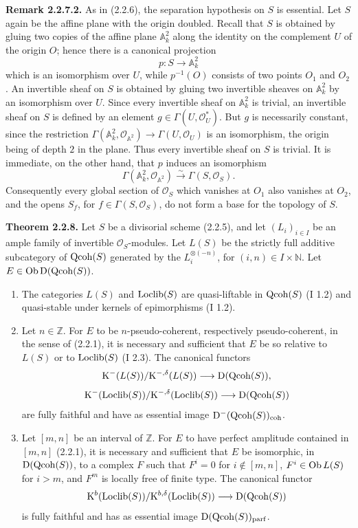 \documentclass[11pt]{article}
\begin{document}
\textbf{Remark 2.2.7.2.} As in (2.2.6), the separation hypothesis on $S$ is essential. Let $S$ again be the affine plane with the origin doubled. Recall that $S$ is obtained by gluing two copies of the affine plane $\mathbb A^2_k$ along the identity on the complement $U$ of the origin $O$; hence there is a canonical projection
\[
p:S\longrightarrow\mathbb A^2_k
\]
which is an isomorphism over $U$, while $p^{-1}(O)$ consists of two points $O_1$ and $O_2$. An invertible sheaf on $S$ is obtained by gluing two invertible sheaves on $\mathbb A^2_k$ by an isomorphism over $U$. Since every invertible sheaf on $\mathbb A^2_k$ is trivial, an invertible sheaf on $S$ is defined by an element $g\in\Gamma(U,\mathcal O_U^*)$. But $g$ is necessarily constant, since the restriction $\Gamma(\mathbb A^2_k,\mathcal O_{\mathbb A^2})\to\Gamma(U,\mathcal O_U)$ is an isomorphism, the origin being of depth $2$ in the plane. Thus every invertible sheaf on $S$ is trivial. It is immediate, on the other hand, that $p$ induces an isomorphism
\[
\Gamma(\mathbb A^2_k,\mathcal O_{\mathbb A^2})\xrightarrow{\sim}\Gamma(S,\mathcal O_S).
\]
Consequently every global section of $\mathcal O_S$ which vanishes at $O_1$ also vanishes at $O_2$, and the opens $S_f$, for $f\in\Gamma(S,\mathcal O_S)$, do not form a base for the topology of $S$.

\textbf{Theorem 2.2.8.} Let $S$ be a divisorial scheme (2.2.5), and let $(L_i)_{i\in I}$ be an ample family of invertible $\mathcal O_S$-modules. Let $L(S)$ be the strictly full additive subcategory of $\operatorname{Qcoh}(S)$ generated by the $L_i^{\otimes(-n)}$, for $(i,n)\in I\times\mathbb N$. Let $E\in\operatorname{Ob}\mathrm D(\operatorname{Qcoh}(S))$.
\begin{enumerate}[label=\alph*)]
\item The categories $L(S)$ and $\operatorname{Loclib}(S)$ are quasi-liftable in $\operatorname{Qcoh}(S)$ (I 1.2) and quasi-stable under kernels of epimorphisms (I 1.2).
\item Let $n\in\mathbb Z$. For $E$ to be $n$-pseudo-coherent, respectively pseudo-coherent, in the sense of (2.2.1), it is necessary and sufficient that $E$ be so relative to $L(S)$ or to $\operatorname{Loclib}(S)$ (I 2.3). The canonical functors
\[
\mathrm K^{-}(L(S))/\mathrm K^{-,\delta}(L(S))\longrightarrow \mathrm D(\operatorname{Qcoh}(S)),
\]
\[
\mathrm K^{-}(\operatorname{Loclib}(S))/\mathrm K^{-,\delta}(\operatorname{Loclib}(S))\longrightarrow \mathrm D(\operatorname{Qcoh}(S))
\]
are fully faithful and have as essential image $\mathrm D^{-}(\operatorname{Qcoh}(S))_{\mathrm{coh}}$.
\item Let $[m,n]$ be an interval of $\mathbb Z$. For $E$ to have perfect amplitude contained in $[m,n]$ (2.2.1), it is necessary and sufficient that $E$ be isomorphic, in $\mathrm D(\operatorname{Qcoh}(S))$, to a complex $F$ such that $F^i=0$ for $i\notin[m,n]$, $F^i\in\operatorname{Ob} L(S)$ for $i>m$, and $F^m$ is locally free of finite type. The canonical functor
\[
\mathrm K^b(\operatorname{Loclib}(S))/\mathrm K^{b,\delta}(\operatorname{Loclib}(S))\longrightarrow \mathrm D(\operatorname{Qcoh}(S))
\]
is fully faithful and has as essential image $\mathrm D(\operatorname{Qcoh}(S))_{\mathrm{parf}}$.
\end{enumerate}
\end{document}
